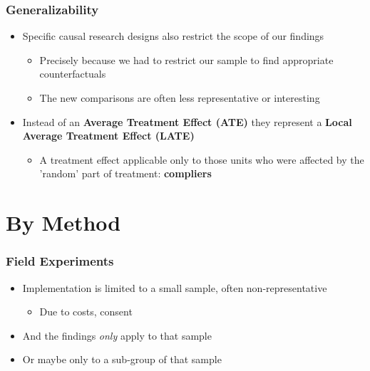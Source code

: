 \documentclass[xcolor=x11names,compress]{beamer}\usepackage[]{graphicx}\usepackage[]{xcolor}
\renewcommand{\(}{\begin{columns}}
\renewcommand{\)}{\end{columns}}
\newcommand{\<}[1]{\begin{column}{#1}}
\renewcommand{\>}{\end{column}}
\begin{document}
\begin{frame}
\frametitle{Generalizability}
\begin{itemize}
\item Specific causal research designs also restrict the scope of our findings
\pause
\begin{itemize}
\item Precisely because we had to restrict our sample to find appropriate counterfactuals
\pause
\item The new comparisons are often less representative or interesting
\pause
\end{itemize}
\item Instead of an \textbf{Average Treatment Effect (ATE)} they represent a \textbf{Local Average Treatment Effect (LATE)}
\pause
\begin{itemize}
\item A treatment effect applicable only to those units who were affected by the 'random' part of treatment: \textbf{compliers}
\end{itemize}
\end{itemize}
\end{frame}

\section{By Method}

\begin{frame}
\frametitle{Field Experiments}
\begin{itemize}
\item Implementation is limited to a small sample, often non-representative
\pause
\begin{itemize}
\item Due to costs, consent
\pause
\end{itemize}
\item And the findings \textit{only} apply to that sample
\pause
\item Or maybe only to a sub-group of that sample
\end{itemize}
\end{frame}
\end{document}
